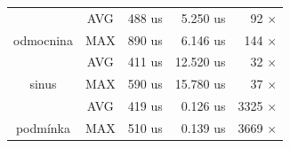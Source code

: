 \begin{table}[h]
\begin{tabular}{@{}ccrrr@{}}
\multicolumn{1}{|c}{}                                & \cellcolor[HTML]{EFEFEF}AVG & \cellcolor[HTML]{EFEFEF}    488 us & \cellcolor[HTML]{EFEFEF}    5.250 us & \multicolumn{1}{r|}{\cellcolor[HTML]{EFEFEF}     92 $\times$}  \\
\multicolumn{1}{|c}{\multirow{-2}{*}{odmocnina}}          & \cellcolor[HTML]{FFFFFF}MAX & \cellcolor[HTML]{FFFFFF}    890 us & \cellcolor[HTML]{FFFFFF}    6.146 us & \multicolumn{1}{r|}{\cellcolor[HTML]{FFFFFF}    144 $\times$}  \\ \midrule
\multicolumn{1}{|c}{}                                & \cellcolor[HTML]{EFEFEF}AVG & \cellcolor[HTML]{EFEFEF}    411 us & \cellcolor[HTML]{EFEFEF}   12.520 us & \multicolumn{1}{r|}{\cellcolor[HTML]{EFEFEF}     32 $\times$}  \\
\multicolumn{1}{|c}{\multirow{-2}{*}{sinus}}           & \cellcolor[HTML]{FFFFFF}MAX & \cellcolor[HTML]{FFFFFF}    590 us & \cellcolor[HTML]{FFFFFF}   15.780 us & \multicolumn{1}{r|}{\cellcolor[HTML]{FFFFFF}     37 $\times$}  \\ \midrule
\multicolumn{1}{|c}{}                                & \cellcolor[HTML]{EFEFEF}AVG & \cellcolor[HTML]{EFEFEF}    419 us & \cellcolor[HTML]{EFEFEF}    0.126 us & \multicolumn{1}{r|}{\cellcolor[HTML]{EFEFEF}   3325 $\times$}  \\
\multicolumn{1}{|c}{\multirow{-2}{*}{podmínka}}     & \cellcolor[HTML]{FFFFFF}MAX & \cellcolor[HTML]{FFFFFF}    510 us & \cellcolor[HTML]{FFFFFF}    0.139 us & \multicolumn{1}{r|}{\cellcolor[HTML]{FFFFFF}   3669 $\times$}  \\ \midrule
\end{tabular}
\end{table}


